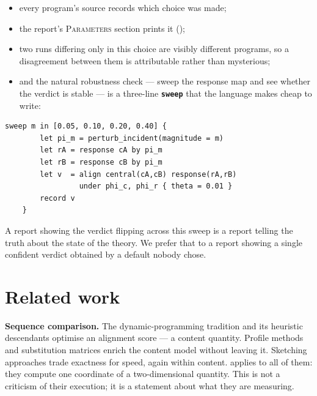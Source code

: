\documentclass[11pt,twocolumn,a4paper]{article}
\theoremstyle{plain}
\theoremstyle{definition}
\theoremstyle{remark}
\newcommand{\kw}[1]{\texttt{\textbf{#1}}}
\begin{document}
\begin{itemize}[leftmargin=1.4em]
\item every program's source records which choice was made;
\item the report's \textsc{Parameters} section prints it
      ();
\item two runs differing only in this choice are visibly different
      programs, so a disagreement between them is attributable rather
      than mysterious;
\item and the natural robustness check --- sweep the response map and
      see whether the verdict is stable --- is a three-line
      \kw{sweep} that the language makes cheap to write:
\end{itemize}

\begin{lstlisting}[style=nonum]
    sweep m in [0.05, 0.10, 0.20, 0.40] {
        let pi_m = perturb_incident(magnitude = m)
        let rA = response cA by pi_m
        let rB = response cB by pi_m
        let v  = align central(cA,cB) response(rA,rB)
                 under phi_c, phi_r { theta = 0.01 }
        record v
    }
\end{lstlisting}

\noindent A report showing the verdict flipping across this sweep is a
report telling the truth about the state of the theory. We prefer that
to a report showing a single confident verdict obtained by a default
nobody chose.

\section{Related work}
\label{sec:related}

\textbf{Sequence comparison.} The dynamic-programming tradition
\cite{needleman1970general,smith1981identification} and its heuristic
descendants \cite{altschul1990basic,altschul1997gapped,buchfink2015fast,steinegger2017mmseqs2}
optimise an alignment score --- a content quantity. Profile methods
\cite{eddy2011accelerated,durbin1998biological} and substitution
matrices \cite{henikoff1992amino} enrich the content model without
leaving it. Sketching approaches \cite{ondov2016mash,jaccard1912distribution}
trade exactness for speed, again within content.
 applies to all of them: they compute one coordinate of
a two-dimensional quantity. This is not a criticism of their execution;
it is a statement about what they are measuring.
\end{document}
